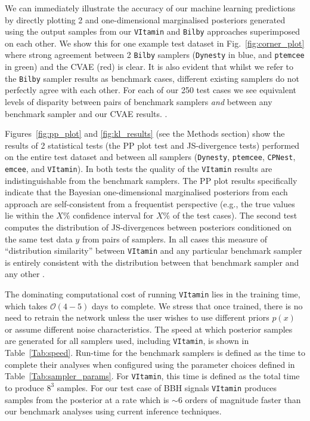 %
%
We can immediately illustrate the accuracy of our machine learning predictions
by directly plotting 2 and one-dimensional marginalised posteriors generated
using the output samples from our \texttt{VItamin} and \texttt{Bilby}
approaches superimposed on each other. We show this for one example test
dataset in Fig.~\ref{fig:corner_plot} where strong agreement between 2
\texttt{Bilby} samplers (\texttt{Dynesty} in blue, and \texttt{ptemcee} in green) and the
\ac{CVAE} (red) is clear. It is also evident that whilst we refer to the
\texttt{Bilby} sampler results as benchmark cases, different existing samplers
do not perfectly agree with each other. For each of our 250 test cases we see
equivalent levels of disparity between pairs of benchmark samplers \emph{and}
between any benchmark sampler and our \ac{CVAE} results.  .

%
%
Figures~\ref{fig:pp_plot} and \ref{fig:kl_results} (see the Methods section)
show the results of 2 statistical tests (the \ac{PP} plot test and
\ac{JS}-divergence tests) performed on the entire test dataset and between all
samplers (\texttt{Dynesty}, \texttt{ptemcee}, \texttt{CPNest}, \texttt{emcee}, and \texttt{VItamin}). In
both tests the quality of the \texttt{VItamin} results are indistinguishable from the
benchmark samplers. The \ac{PP} plot results specifically indicate that the
Bayesian one-dimensional marginalised posteriors from each approach are
self-consistent from a frequentist perspective (e.g., the true values lie
within the $X\%$ confidence interval for $X\%$ of the test cases). The second
test computes the distribution of \ac{JS}-divergences between posteriors
conditioned on the same test data $y$ from pairs of samplers. In all cases this
measure of ``distribution similarity'' between \texttt{VItamin} and any particular
benchmark sampler is entirely consistent with the distribution between that
benchmark sampler and any other .

%
%
The dominating computational cost of running \texttt{VItamin} lies in the
training time, which takes $\mathcal{O}(4-5)$ days to complete. We
stress that once trained, there is no need to retrain the network unless the
user wishes to use different priors $p(x)$ or assume different noise
characteristics. The speed at which posterior samples are generated for all
samplers used, including \texttt{VItamin}, is shown in Table~\ref{Tab:speed}.
Run-time for the benchmark samplers is defined as the time to complete their
analyses when configured using the parameter choices defined in
Table~\ref{Tab:sampler_params}. For \texttt{VItamin}, this time is defined as
the total time to produce $8^3$ samples. For our test case of \ac{BBH} signals
\texttt{VItamin} produces samples from the posterior at a rate which is $\sim
6$ orders of magnitude faster than our benchmark analyses using current
inference techniques. 

